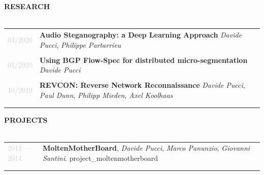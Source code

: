 \documentclass{article}
\begin{document}
\newpage

\textbf{\textcolor{deepblue}{\uppercase{{{research}}}}} \\\\ \hfill
\begin{tabular}{ R{3cm} L{12cm} }
	\textcolor{lightgray}{03/2020} &
		\textbf{Audio Steganography: a Deep Learning Approach} \linebreak
		\textit{Davide Pucci}, \textit{Philippe Partarrieu} \\\\ \hfill
	\textcolor{lightgray}{01/2020} &
		\textbf{Using BGP Flow-Spec for distributed micro-segmentation} \linebreak
		\textit{Davide Pucci} \\\\ \hfill
	\textcolor{lightgray}{10/2019} &
		\textbf{REVCON: Reverse Network Reconnaissance} \linebreak
		\textit{Davide Pucci}, \textit{Paul Dunn}, \textit{Philipp Mieden}, \textit{Axel Koolhaas} \\\\ \hfill
\end{tabular}

\textbf{\textcolor{deepblue}{\uppercase{{{projects}}}}} \\\\ \hfill
\begin{tabular}{ R{3cm} L{12cm} }
	\textcolor{lightgray}{2012 — 2014} &
		\textbf{MoltenMotherBoard}, \textit{Davide Pucci}, \textit{Marco Panunzio}, \textit{Giovanni Santini}. \linebreak
		{{project_moltenmotherboard}} \\\\ \hfill
\end{tabular}
\end{document}
